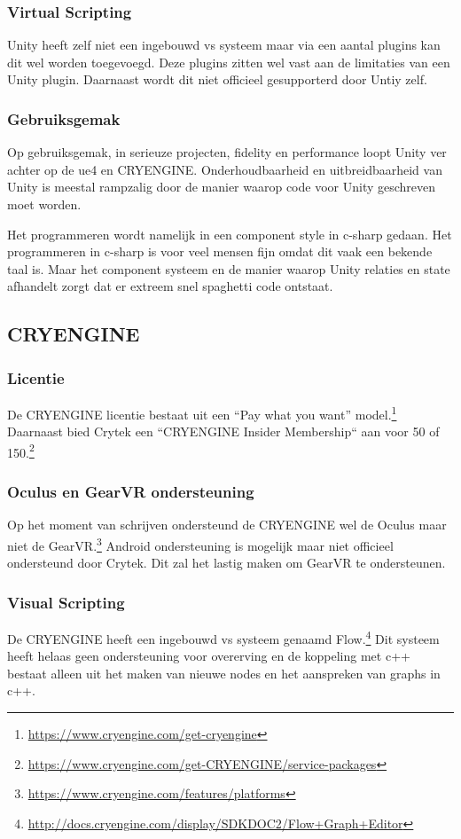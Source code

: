 \subsubsection{Virtual Scripting}
Unity heeft zelf niet een ingebouwd \gls{vs} systeem maar via een aantal plugins kan dit wel worden toegevoegd. Deze plugins zitten wel vast aan de limitaties van een Unity plugin. Daarnaast wordt dit niet officieel gesupporterd door Untiy zelf.

\subsubsection{Gebruiksgemak}
Op gebruiksgemak, in serieuze projecten, fidelity en performance loopt Unity ver achter op de \gls{ue4} en CRYENGINE. Onderhoudbaarheid en uitbreidbaarheid van Unity is meestal rampzalig door de manier waarop code voor Unity geschreven moet worden. 

Het programmeren wordt namelijk in een component style in c-sharp gedaan. Het programmeren in c-sharp is voor veel mensen fijn omdat dit vaak een bekende taal is. Maar het component systeem en de manier waarop Unity relaties en state afhandelt zorgt dat er extreem snel spaghetti code ontstaat. 

\subsection{CRYENGINE}
\subsubsection{Licentie}
De CRYENGINE licentie bestaat uit een “Pay what you want” model.\footnote{\url{https://www.cryengine.com/get-cryengine}} Daarnaast bied Crytek een “CRYENGINE Insider Membership“ aan voor 50 of 150.\footnote{\url{https://www.cryengine.com/get-CRYENGINE/service-packages}} 

\subsubsection{Oculus en GearVR ondersteuning}
Op het moment van schrijven ondersteund de CRYENGINE wel de Oculus maar niet de GearVR.\footnote{\url{https://www.cryengine.com/features/platforms}} Android ondersteuning is mogelijk maar niet officieel ondersteund door Crytek. Dit zal het lastig maken om GearVR te ondersteunen.

\subsubsection{Visual Scripting}
De CRYENGINE heeft een ingebouwd \gls{vs} systeem genaamd Flow.\footnote{\url{http://docs.cryengine.com/display/SDKDOC2/Flow+Graph+Editor}} Dit systeem heeft helaas geen ondersteuning voor overerving en de koppeling met c++ bestaat alleen uit het maken van nieuwe nodes en het aanspreken van graphs in c++.

